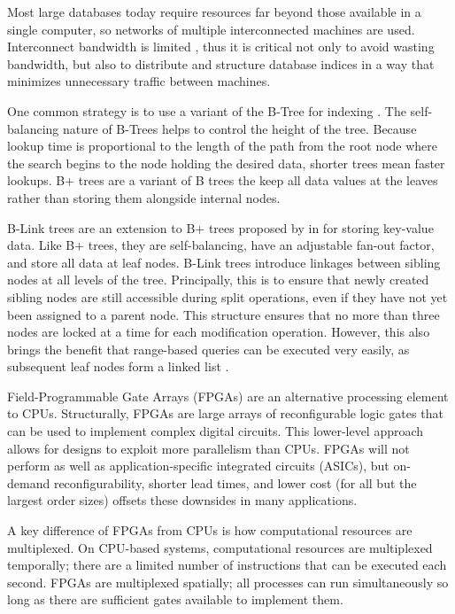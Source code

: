 
\label{sec:indexing}

Most large databases today require resources far beyond those available in a
single computer, so networks of multiple interconnected machines are used.
Interconnect bandwidth is limited \autocite{binnig-vldb-2016}, thus it is
critical not only to avoid wasting bandwidth, but also to distribute and
structure database indices in a way that minimizes unnecessary traffic between
machines.

One common strategy is to use a variant of the B-Tree for indexing
\autocite{ma-tpds-2022}. The self-balancing nature of B-Trees helps to control
the height of the tree. Because lookup time is proportional to the length of the
path from the root node where the search begins to the node holding the desired
data, shorter trees mean faster lookups. B+ trees are a variant of B trees the
keep all data values at the leaves rather than storing them alongside internal
nodes.

B-Link trees are an extension to B+ trees proposed by \citeauthor{b-link} in
\citeyear{b-link} for storing key-value data. Like B+ trees, they are
self-balancing, have an adjustable fan-out factor, and store all data at leaf
nodes. B-Link trees introduce linkages between sibling nodes at all levels of
the tree. Principally, this is to ensure that newly created sibling nodes are
still accessible during split operations, even if they have not yet been
assigned to a parent node. This structure ensures that no more than three nodes
are locked at a time for each modification operation. However, this also brings
the benefit that range-based queries can be executed very easily, as subsequent
leaf nodes form a linked list \autocite{b-link}.


\label{sec:fpga}

Field-Programmable Gate Arrays (FPGAs) are an alternative processing element to
CPUs. Structurally, FPGAs are large arrays of reconfigurable logic gates that
can be used to implement complex digital circuits. This lower-level approach
allows for designs to exploit more parallelism than CPUs. FPGAs will not perform
as well as application-specific integrated circuits (ASICs), but on-demand
reconfigurability, shorter lead times, and lower cost (for all but the largest
order sizes) offsets these downsides in many applications.

A key difference of FPGAs from CPUs is how computational resources are
multiplexed. On CPU-based systems, computational resources are multiplexed
temporally; there are a limited number of instructions that can be executed each
second. FPGAs are multiplexed spatially; all processes can run simultaneously so
long as there are sufficient gates available to implement them.

